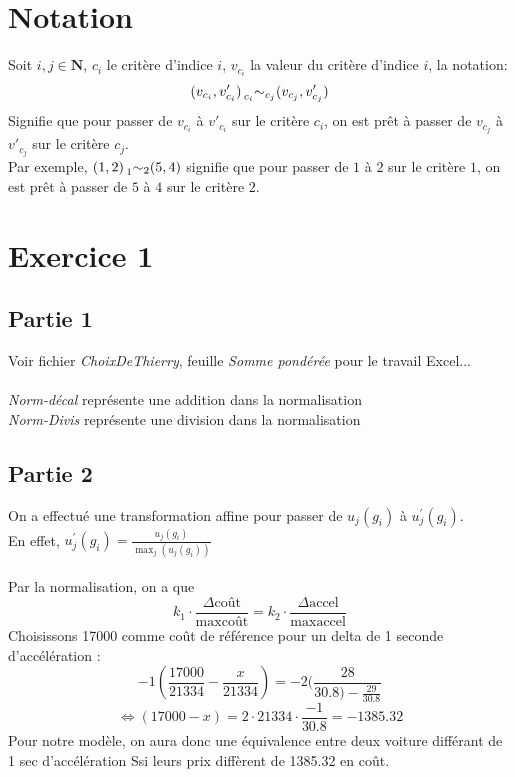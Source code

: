 \documentclass[a4paper, 12pt]{article}
\newcommand*{\indifchange}[4]{#1 \prescript{}{#2}{\sim}_{#3} #4}
\begin{document}
	\section*{Notation}
	Soit $i,j \in \mathbf{N}$, $c_i$ le critère d'indice $i$, $v_{c_i}$ la valeur du critère d'indice $i$,
	la notation:
	$$\indifchange{(v_{c_i},v'_{c_i})}{c_i}{c_j}{(v_{c_j},v'_{c_j})}$$
	Signifie que pour passer de $v_{c_i}$ à $v'_{c_i}$ sur le critère $c_i$, on est prêt à passer de
	$v_{c_j}$ à $v'_{c_j}$ sur le critère $c_j$.\\
	
	Par exemple, $\indifchange{(1,2)}{1}{2}{(5,4)}$ signifie que pour passer de $1$ à $2$ sur
	le critère $1$, on est prêt à passer de $5$ à $4$ sur le critère $2$.
	\section*{Exercice 1}
		\subsection*{Partie 1}
			Voir fichier \textit{ChoixDeThierry}, feuille 
			\textit{Somme pondérée} pour le travail Excel...\\
			~\\
			\textit{Norm-décal} représente une addition dans la
			 normalisation\\
			\textit{Norm-Divis} représente une division dans la 
			 normalisation
		\subsection*{Partie 2}
			On a effectué une transformation affine pour passer de
			$u_j(g_i)$ à $u^{'}_{j}(g_i)$. \\
			En effet,  $u^{'}_{j}(g_i) = 
			\frac{u_j(g_i)}{\max_j (u_j(g_i))}$\\
			~\\
			Par la normalisation, on a que 
			$$ k_1 \cdot \frac{\Delta \text{coût}}{\max \text{coût}} 
			 = k_2 \cdot \frac{\Delta \text{accel}}{\max \text{accel}}$$
			Choisissons 17000 comme coût de référence pour un delta de 1
			seconde d'accélération : 
			$$ -1 (\frac{17000}{21334} - \frac{x}{21334})
			 = -2 (\frac{28}{30.8) - \frac{29}{30.8}} $$
			$$ \Leftrightarrow 
			   (17000 - x) = 2 \cdot 21334 \cdot \frac{-1}{30.8} 
			 = -1385.32 $$
			Pour notre modèle, on aura donc une équivalence entre deux
			voiture différant de 1 sec d'accélération Ssi leurs prix 
			diffèrent de 1385.32 en coût.
\end{document}
